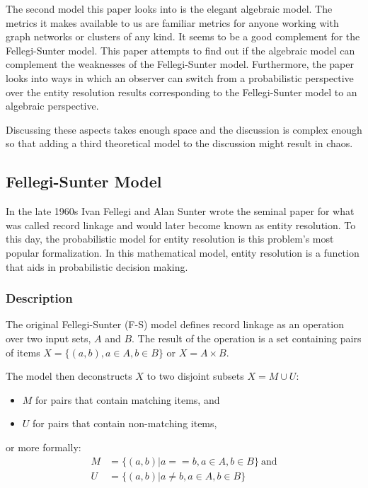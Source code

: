 \documentclass[journal]{IEEEtran}
\begin{document}
    The second model this paper looks into is the elegant algebraic model.
    The metrics it makes available to us are familiar metrics for anyone working
    with graph networks or clusters of any kind.
    It seems to be a good complement for the Fellegi-Sunter model.
    This paper attempts to find out if the algebraic model can complement the
    weaknesses of the Fellegi-Sunter model.
    Furthermore, the paper looks into ways in which an observer can switch from
    a probabilistic perspective over the entity resolution results corresponding
    to the Fellegi-Sunter model to an algebraic perspective.

    Discussing these aspects takes enough space and the discussion is complex
    enough so that adding a third theoretical model to the discussion might
    result in chaos.

    \subsection[fsm]{Fellegi-Sunter Model}\label{subsec:fsm}

    In the late 1960s Ivan Fellegi and Alan Sunter wrote the seminal
    paper\cite{fs1969} for what was called record linkage and would later become
    known as entity resolution.
    To this day, the probabilistic model for entity resolution is this problem's
    most popular formalization.
    In this mathematical model, entity resolution is a function that aids in 
    probabilistic decision making.
    
    \subsubsection[fsm-desc]{Description}\label{subsubsec:fsm-desc}

    The original Fellegi-Sunter (F-S) model defines record linkage as an operation over two input
    sets, $A$ and $B$.
    The result of the operation is a set containing pairs of items
    $X = \{(a, b), a \in A, b \in B\}$ or $X = A \times B$.
    
    The model then deconstructs $X$ to two disjoint subsets $X = M \cup U$:
    \begin{itemize}
        \item $M$ for pairs that contain matching items, and
        \item $U$ for pairs that contain non-matching items,
    \end{itemize}
    or more formally:
    \begin{align}
        M &= \{(a, b) | a == b, a \in A, b \in B\}~\textrm{and}\nonumber \\
        U &= \{(a, b) | a \neq b, a \in A, b \in B\}\nonumber
    \end{align}
\end{document}
